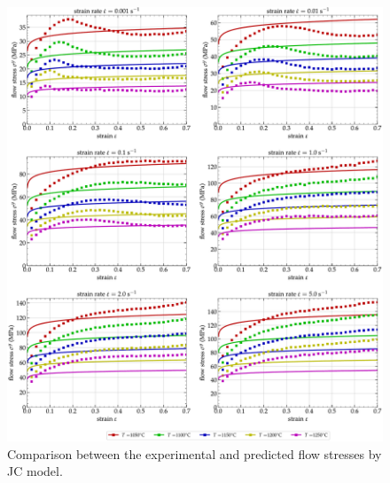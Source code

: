 \documentclass[twoside,english,1p,final,sort&compress]{elsarticle}
\theoremstyle{plain}
\begin{document}
\begin{figure}[!ht]
\centering
\includegraphics[width=1.02\columnwidth]{Figures/CompExp-JC-6}
\caption{Comparison between the experimental and predicted flow stresses by JC model.}
\label{fig:iCorrelationJC}
\end{figure}

\end{document}
